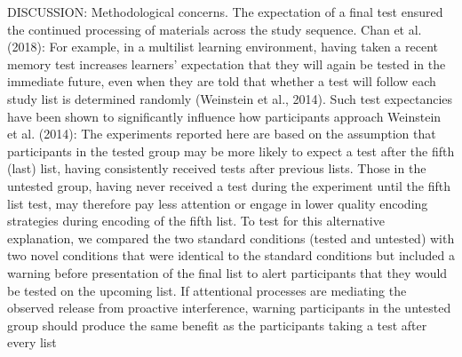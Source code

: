 \documentclass[../main.tex]{subfiles}
\begin{document}
DISCUSSION:
Methodological concerns. The expectation of a final test ensured the
continued processing of materials across the study sequence.
Chan et al. (2018): %
For example, in a multilist learning environment, having taken a
recent memory test increases learners’ expectation that they will
again be tested in the immediate future, even when they are told
that whether a test will follow each study list is determined
randomly (Weinstein et al., 2014). Such test expectancies have
been shown to significantly influence how participants approach
Weinstein et al. (2014):
The experiments reported here are based on the assumption that
participants in the tested group may be more likely to expect a test
after the fifth (last) list, having consistently received tests after
previous lists. Those in the untested group, having never received
a test during the experiment until the fifth list test, may therefore
pay less attention or engage in lower quality encoding strategies
during encoding of the fifth list. To test for this alternative explanation, 
we compared the two standard conditions (tested and
untested) with two novel conditions that were identical to the
standard conditions but included a warning before presentation of
the final list to alert participants that they would be tested on the
upcoming list. If attentional processes are mediating the observed
release from proactive interference, warning participants in the
untested group should produce the same benefit as the participants
taking a test after every list
\end{document}

